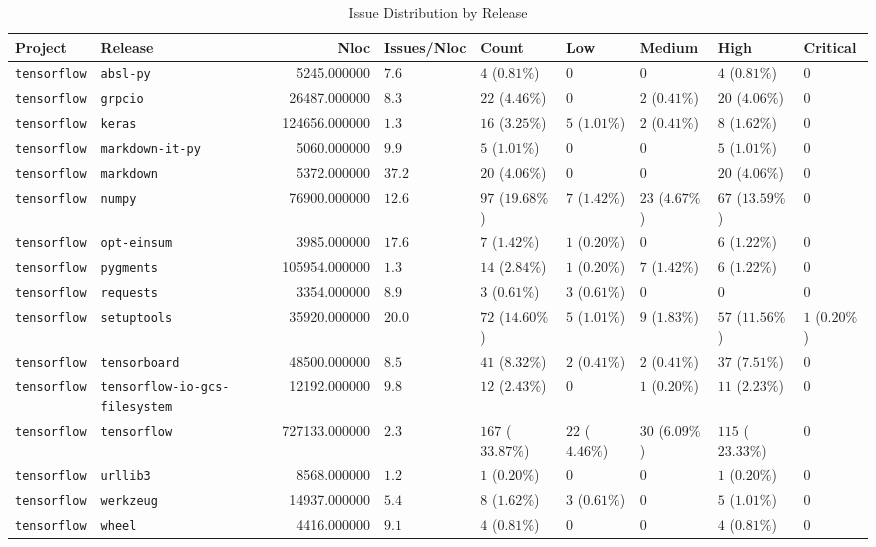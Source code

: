 \begin{table}
\caption{Issue Distribution by Release}
\label{tab:issue-release-distribution}
\begin{tabular}{llrllllll}
\toprule
Project & Release & Nloc & Issues/Nloc & Count & Low & Medium & High & Critical \\
\midrule
\texttt{tensorflow} & \texttt{absl-py} & 5245.000000 & $7.6$ & $4$ ($0.81\%$) & $0$ & $0$ & $4$ ($0.81\%$) & $0$ \\
\texttt{tensorflow} & \texttt{grpcio} & 26487.000000 & $8.3$ & $22$ ($4.46\%$) & $0$ & $2$ ($0.41\%$) & $20$ ($4.06\%$) & $0$ \\
\texttt{tensorflow} & \texttt{keras} & 124656.000000 & $1.3$ & $16$ ($3.25\%$) & $5$ ($1.01\%$) & $2$ ($0.41\%$) & $8$ ($1.62\%$) & $0$ \\
\texttt{tensorflow} & \texttt{markdown-it-py} & 5060.000000 & $9.9$ & $5$ ($1.01\%$) & $0$ & $0$ & $5$ ($1.01\%$) & $0$ \\
\texttt{tensorflow} & \texttt{markdown} & 5372.000000 & $37.2$ & $20$ ($4.06\%$) & $0$ & $0$ & $20$ ($4.06\%$) & $0$ \\
\texttt{tensorflow} & \texttt{numpy} & 76900.000000 & $12.6$ & $97$ ($19.68\%$) & $7$ ($1.42\%$) & $23$ ($4.67\%$) & $67$ ($13.59\%$) & $0$ \\
\texttt{tensorflow} & \texttt{opt-einsum} & 3985.000000 & $17.6$ & $7$ ($1.42\%$) & $1$ ($0.20\%$) & $0$ & $6$ ($1.22\%$) & $0$ \\
\texttt{tensorflow} & \texttt{pygments} & 105954.000000 & $1.3$ & $14$ ($2.84\%$) & $1$ ($0.20\%$) & $7$ ($1.42\%$) & $6$ ($1.22\%$) & $0$ \\
\texttt{tensorflow} & \texttt{requests} & 3354.000000 & $8.9$ & $3$ ($0.61\%$) & $3$ ($0.61\%$) & $0$ & $0$ & $0$ \\
\texttt{tensorflow} & \texttt{setuptools} & 35920.000000 & $20.0$ & $72$ ($14.60\%$) & $5$ ($1.01\%$) & $9$ ($1.83\%$) & $57$ ($11.56\%$) & $1$ ($0.20\%$) \\
\texttt{tensorflow} & \texttt{tensorboard} & 48500.000000 & $8.5$ & $41$ ($8.32\%$) & $2$ ($0.41\%$) & $2$ ($0.41\%$) & $37$ ($7.51\%$) & $0$ \\
\texttt{tensorflow} & \texttt{tensorflow-io-gcs-filesystem} & 12192.000000 & $9.8$ & $12$ ($2.43\%$) & $0$ & $1$ ($0.20\%$) & $11$ ($2.23\%$) & $0$ \\
\texttt{tensorflow} & \texttt{tensorflow} & 727133.000000 & $2.3$ & $167$ ($33.87\%$) & $22$ ($4.46\%$) & $30$ ($6.09\%$) & $115$ ($23.33\%$) & $0$ \\
\texttt{tensorflow} & \texttt{urllib3} & 8568.000000 & $1.2$ & $1$ ($0.20\%$) & $0$ & $0$ & $1$ ($0.20\%$) & $0$ \\
\texttt{tensorflow} & \texttt{werkzeug} & 14937.000000 & $5.4$ & $8$ ($1.62\%$) & $3$ ($0.61\%$) & $0$ & $5$ ($1.01\%$) & $0$ \\
\texttt{tensorflow} & \texttt{wheel} & 4416.000000 & $9.1$ & $4$ ($0.81\%$) & $0$ & $0$ & $4$ ($0.81\%$) & $0$ \\
\bottomrule
\end{tabular}
\end{table}
